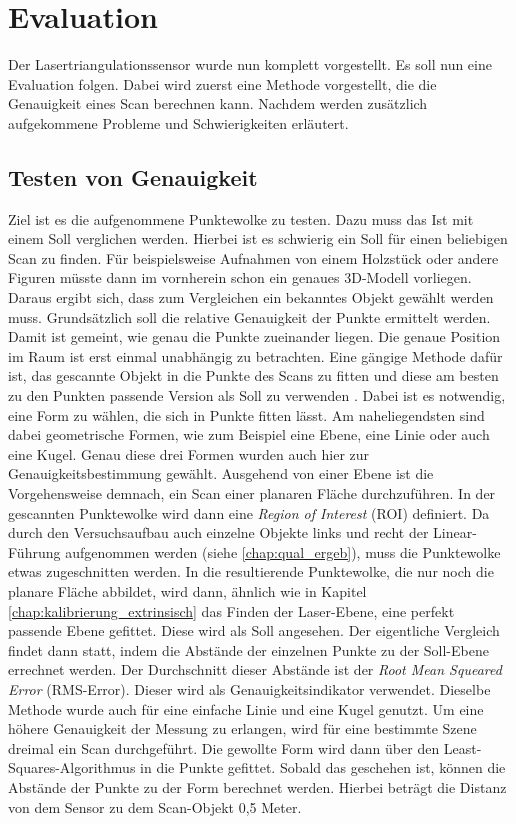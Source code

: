 \section{Evaluation}
		
		Der Lasertriangulationssensor wurde nun komplett vorgestellt. Es soll nun eine Evaluation folgen. Dabei wird zuerst eine Methode vorgestellt, die die Genauigkeit eines Scan berechnen kann. Nachdem werden zusätzlich aufgekommene Probleme und Schwierigkeiten erläutert.   
		\subsection{Testen von Genauigkeit}
		Ziel ist es die aufgenommene Punktewolke zu testen. Dazu muss das \glqq Ist\grqq{} mit einem \glqq Soll\grqq{} verglichen werden. Hierbei ist es schwierig ein \glqq Soll\grqq{} für einen beliebigen Scan zu finden. Für beispielsweise Aufnahmen von einem Holzstück oder andere Figuren müsste dann im vornherein schon ein genaues 3D-Modell vorliegen. Daraus ergibt sich, dass zum Vergleichen ein bekanntes Objekt gewählt werden muss. Grundsätzlich soll die relative Genauigkeit der Punkte ermittelt werden. Damit ist gemeint, wie genau die Punkte zueinander liegen. Die genaue Position im Raum ist erst einmal unabhängig zu betrachten. Eine gängige Methode dafür ist, das gescannte Objekt in die Punkte des Scans zu fitten und diese am besten zu den Punkten passende Version als \glqq Soll\grqq{} zu verwenden \citep[vgl.][]{bart_accuracy_nodate} \citep[vgl.][]{song_multi-view_2019}. Dabei ist es notwendig, eine Form zu wählen, die sich in Punkte fitten lässt. Am naheliegendsten sind dabei geometrische Formen, wie zum Beispiel eine Ebene, eine Linie oder auch eine Kugel. Genau diese drei Formen wurden auch hier zur Genauigkeitsbestimmung gewählt. Ausgehend von einer Ebene ist die  Vorgehensweise demnach, ein Scan einer planaren Fläche durchzuführen. In der gescannten Punktewolke wird dann eine \textit{Region of Interest} (ROI) definiert. Da durch den Versuchsaufbau auch einzelne Objekte links und recht der Linear-Führung aufgenommen werden (siehe \ref{chap:qual_ergeb}), muss die Punktewolke etwas zugeschnitten werden. In die resultierende Punktewolke, die nur noch die planare Fläche abbildet, wird dann, ähnlich wie in Kapitel \ref{chap:kalibrierung_extrinsisch} das Finden der Laser-Ebene, eine perfekt passende Ebene gefittet. Diese wird als \glqq Soll\grqq{} angesehen. Der eigentliche Vergleich findet dann statt, indem die Abstände der einzelnen Punkte zu der \glqq Soll\grqq-Ebene errechnet werden. Der Durchschnitt dieser Abstände ist der \textit{Root Mean Squeared Error} (RMS-Error). Dieser wird als Genauigkeitsindikator verwendet. Dieselbe Methode wurde auch für eine einfache Linie und eine Kugel genutzt. Um eine höhere Genauigkeit der Messung zu erlangen, wird für eine bestimmte Szene dreimal ein Scan durchgeführt. Die gewollte Form wird dann über den Least-Squares-Algorithmus in die Punkte gefittet. Sobald das geschehen ist, können die Abstände der Punkte zu der Form berechnet werden. Hierbei beträgt die Distanz von dem Sensor zu dem Scan-Objekt 0,5 Meter. \newline
